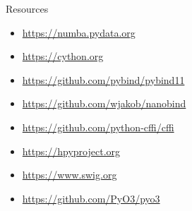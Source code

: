 \documentclass[presentation]{beamer}
\begin{document}
\begin{frame}[label=resources]{Resources}
\begin{itemize}
\item \url{https://numba.pydata.org}
\item \url{https://cython.org}
\item \url{https://github.com/pybind/pybind11}
\item \url{https://github.com/wjakob/nanobind}
\item \url{https://github.com/python-cffi/cffi}
\item \url{https://hpyproject.org}
\item \url{https://www.swig.org}
\item \url{https://github.com/PyO3/pyo3}
\end{itemize}
\end{frame}
\end{document}
